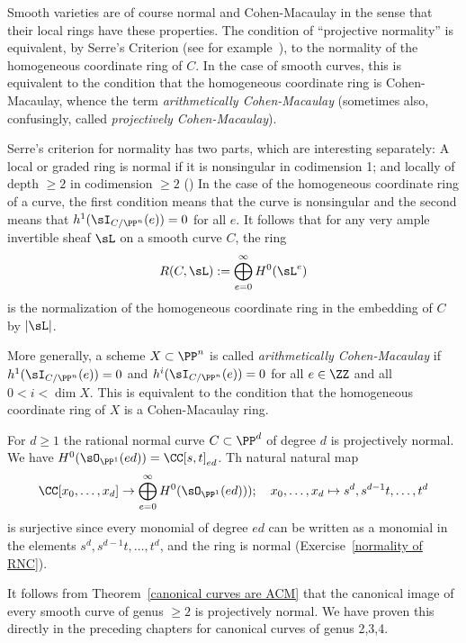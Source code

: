  
\begin{remark}
 Smooth varieties are of course normal and Cohen-Macaulay in the sense that their local rings have these properties. The condition of ``projective normality'' is equivalent, by Serre's Criterion (see for example~\cite[Section 11.2]{Eisenbud1995}), to the normality of the homogeneous coordinate ring of $C$. In the case of smooth curves, this is equivalent to the condition that the homogeneous coordinate
ring is Cohen-Macaulay, whence the term \emph{arithmetically Cohen-Macaulay} (sometimes also, confusingly, called
\emph{projectively Cohen-Macaulay}).


Serre's criterion for normality has two parts, which are interesting separately: A local or graded ring is normal if it is nonsingular in
codimension 1; and
locally of depth $\geq 2$ in codimension $\geq 2$ (\cite[Theorem 11.5]{Eisenbud1995}) In the case of the homogeneous coordinate ring of a curve, 
the first condition means that the curve is nonsingular and the second means that $h^1(\sI_{C/\PP^n}(e))=0$ for all $e$.
It follows that for any very ample invertible sheaf $\sL$ on a smooth curve $C$, the ring 
$$
R(C, \sL) := \bigoplus_{e=0}^\infty H^0(\sL^e)
$$
is the normalization of the homogeneous coordinate ring in the embedding of $C$ by $|\sL|$.

More generally, a scheme
$X\subset \PP^n$ is called \emph{arithmetically Cohen-Macaulay} if 
$h^1(\sI_{C/\PP^n}(e))=0$ and $h^i(\sI_{C/\PP^n}(e))=0$ for all $e\in \ZZ$ and all $0<i<\dim X$.
This is equivalent to the condition that the homogeneous coordinate ring of $X$ is a Cohen-Macaulay
ring.

\end{remark}

\begin{example}\label{rnc is projectively normal}
For $d\geq 1$ the rational normal curve $C\subset \PP^d$ of degree $d$ is projectively normal. 
We have $H^0(\sO_{\PP^1}(ed))  = \CC[s,t]_{ed}$. Th natural natural map
$$
\CC[x_0,\dots,x_d] \to\bigoplus_{e = 0}^\infty H^0(\sO_{\PP^1}(ed)));\quad x_0,\dots, x_d \mapsto s^d,s^{d-1}t,\dots, t^d
$$ 
is surjective since every monomial of degree $ed$ can be written as a monomial in  
the elements $s^d,s^{d-1}t,\dots, t^d$, and the ring is normal (Exercise~\ref{normality of RNC}).
\end{example}

It follows from Theorem~\ref{canonical curves are ACM} that the canonical image of every smooth curve of genus $\geq 2$ is projectively normal. We have proven this directly in the preceding chapters for canonical curves of genus 2,3,4.

